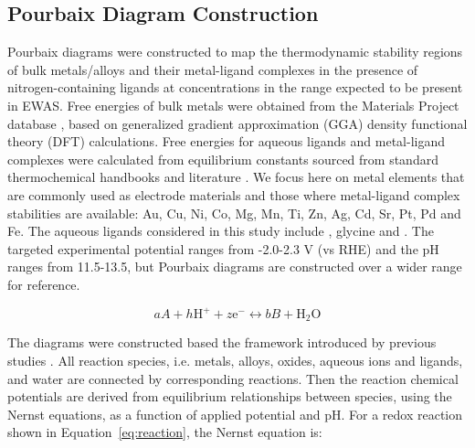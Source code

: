 \documentclass[journal=jacsat,manuscript=article]{achemso}
\begin{document}
\subsection{Pourbaix Diagram Construction}
Pourbaix diagrams were constructed to map the thermodynamic stability regions of bulk metals/alloys and their metal-ligand complexes in the presence of nitrogen-containing ligands at concentrations in the range expected to be present in EWAS.
Free energies of bulk metals were obtained from the Materials Project database \cite{Jain2013TheInnovation}, based on generalized gradient approximation (GGA) density functional theory (DFT) calculations. Free energies for aqueous ligands and metal-ligand complexes were calculated from equilibrium constants sourced from standard thermochemical handbooks \cite{Wagman1982TheUnits, Smith1989CriticalConstants, Bard2017StandardSolution, Bjerrum1957StabilitySubstances} and literature \cite{Meng1996PrinciplesReview, Azadi2019DataComplexes, Aviles2022ExploringNH3, Oraby2023SelectiveSolutions, Harrington2005DeterminationIon}. We focus here on metal elements that are commonly used as electrode materials and those where metal-ligand complex stabilities are available: Au, Cu, Ni, Co, Mg, Mn, Ti, Zn, Ag, Cd, Sr, Pt, Pd and Fe. The aqueous ligands considered in this study include , glycine and . The targeted experimental potential ranges from -2.0-2.3 V (vs RHE) and the pH ranges from 11.5-13.5, but Pourbaix diagrams are constructed over a wider range for reference.

\begin{equation} \label{eq:reaction}
aA + h\text{H}^+ + z\text{e}^- \leftrightarrow bB + \text{H}_2\text{O}
\end{equation}

The diagrams were constructed based the framework introduced by previous studies \cite{PourbaixAtlasSolutions, Huang2017ImprovedCompounds,Huang2015ElectrochemicalCalculations,Singh2017ElectrochemicalMaterials,Patel2019EfficientCompounds,Persson2012PredictionStates, Ding2018ElectrochemicalStates, Thompson2011PourbaixSystems}. All reaction species, i.e. metals, alloys, oxides, aqueous ions and ligands, and water are connected by corresponding reactions. Then the reaction chemical potentials are derived from equilibrium relationships between species, using the Nernst equations, as a function of applied potential and pH. For a redox reaction shown in Equation~\eqref{eq:reaction}, the Nernst equation is:
\end{document}
